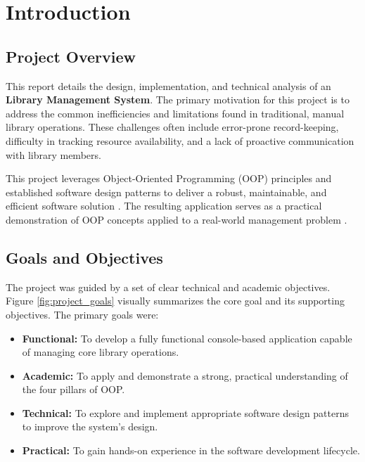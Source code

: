 \section{Introduction}
\label{sec:introduction}

\subsection{Project Overview}
This report details the design, implementation, and technical analysis of an \textbf{Library Management System}. The primary motivation for this project is to address the common inefficiencies and limitations found in traditional, manual library operations. These challenges often include error-prone record-keeping, difficulty in tracking resource availability, and a lack of proactive communication with library members.

This project leverages Object-Oriented Programming (OOP) principles and established software design patterns to deliver a robust, maintainable, and efficient software solution \cite{Booch2007}. The resulting application serves as a practical demonstration of OOP concepts applied to a real-world management problem \cite{GoF1994}.

\subsection{Goals and Objectives}
The project was guided by a set of clear technical and academic objectives. Figure \ref{fig:project_goals} visually summarizes the core goal and its supporting objectives. The primary goals were:

\begin{itemize}
	\item \textbf{Functional:} To develop a fully functional console-based application capable of managing core library operations.
	\item \textbf{Academic:} To apply and demonstrate a strong, practical understanding of the four pillars of OOP.
	\item \textbf{Technical:} To explore and implement appropriate software design patterns to improve the system's design.
	\item \textbf{Practical:} To gain hands-on experience in the software development lifecycle.
\end{itemize}



